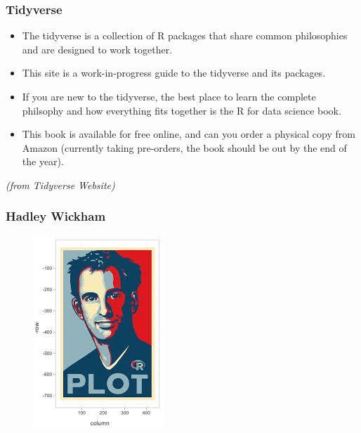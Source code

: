 \documentclass{beamer}
\begin{document}
\begin{frame}
\frametitle{Tidyverse}		
\large	
\vspace{-0.8cm}
\begin{itemize}
\item The tidyverse is a collection of R packages that share common philosophies and are designed to work together. 
			
\item This site is a work-in-progress guide to the tidyverse and its packages.
			
\item If you are new to the tidyverse, the best place to learn the complete philsophy and how everything fits together is the R for data science book. 
			
\item This book is available for free online, and can you order a physical copy from Amazon (currently taking pre-orders, the book should be out by the end of the year).

\end{itemize}
\textit{(from Tidyverse Website)}	
\end{frame}
\begin{frame}
\frametitle{Hadley Wickham}
\begin{figure}
\centering
\includegraphics[width=0.5\linewidth]{images/HWgraphic}
\end{figure}
\end{frame}
\end{document}
